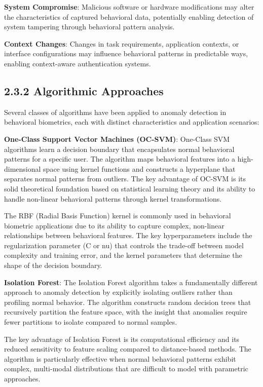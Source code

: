 \documentclass[
  12pt,
  a4paper,
]{report}
\begin{document}
\textbf{System Compromise}: Malicious software or hardware modifications
may alter the characteristics of captured behavioral data, potentially
enabling detection of system tampering through behavioral pattern
analysis.

\textbf{Context Changes}: Changes in task requirements, application
contexts, or interface configurations may influence behavioral patterns
in predictable ways, enabling context-aware authentication systems.

\subsection{2.3.2 Algorithmic Approaches}\label{algorithmic-approaches}

Several classes of algorithms have been applied to anomaly detection in
behavioral biometrics, each with distinct characteristics and
application scenarios:

\textbf{One-Class Support Vector Machines (OC-SVM)}: One-Class SVM
algorithms learn a decision boundary that encapsulates normal behavioral
patterns for a specific user. The algorithm maps behavioral features
into a high-dimensional space using kernel functions and constructs a
hyperplane that separates normal patterns from outliers. The key
advantage of OC-SVM is its solid theoretical foundation based on
statistical learning theory and its ability to handle non-linear
behavioral patterns through kernel transformations.

The RBF (Radial Basis Function) kernel is commonly used in behavioral
biometric applications due to its ability to capture complex, non-linear
relationships between behavioral features. The key hyperparameters
include the regularization parameter (C or nu) that controls the
trade-off between model complexity and training error, and the kernel
parameters that determine the shape of the decision boundary.

\textbf{Isolation Forest}: The Isolation Forest algorithm takes a
fundamentally different approach to anomaly detection by explicitly
isolating outliers rather than profiling normal behavior. The algorithm
constructs random decision trees that recursively partition the feature
space, with the insight that anomalies require fewer partitions to
isolate compared to normal samples.

The key advantage of Isolation Forest is its computational efficiency
and its reduced sensitivity to feature scaling compared to
distance-based methods. The algorithm is particularly effective when
normal behavioral patterns exhibit complex, multi-modal distributions
that are difficult to model with parametric approaches.
\end{document}
